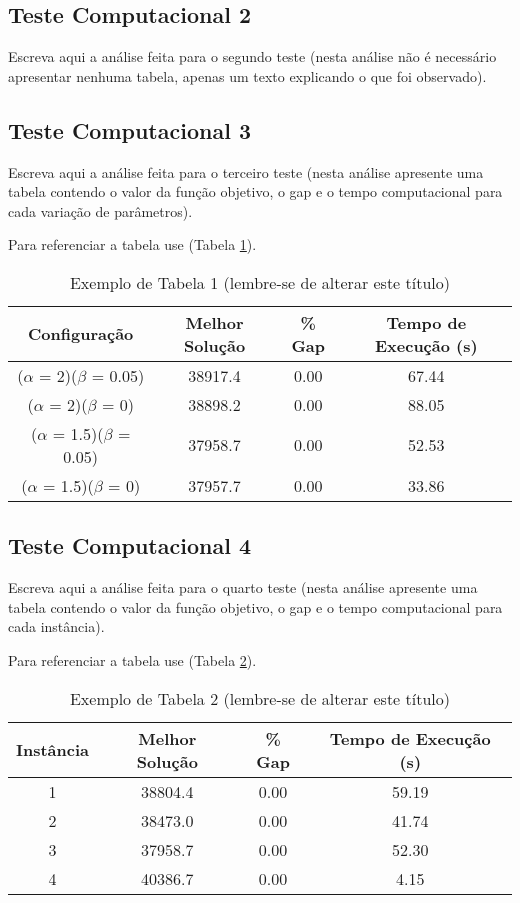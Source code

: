 \documentclass{article}
\begin{document}
\subsection{Teste Computacional 2}

Escreva aqui a análise feita para o segundo teste (nesta análise não é necessário apresentar nenhuma tabela, apenas um texto explicando o que foi observado).

\subsection{Teste Computacional 3}

Escreva aqui a análise feita para o terceiro teste (nesta análise apresente uma tabela contendo o valor da função objetivo, o gap e o tempo computacional para cada variação de parâmetros).

Para referenciar a tabela use (Tabela \ref{tab:configuracoes}).

\begin{table}[H]
	\centering
	\caption{Exemplo de Tabela 1 (lembre-se de alterar este título)}
		\begin{tabular}{c c c c} \hline
	 	Configuração & Melhor Solução & \% Gap & Tempo de Execução (s) \\ \hline
		  ($\alpha$ = 2)($\beta$ = 0.05) & 38917.4 & 0.00 & 67.44 \\
		($\alpha$ = 2)($\beta$ = 0) & 38898.2 & 0.00 & 88.05 \\ 
		($\alpha$ = 1.5)($\beta$ = 0.05) & 37958.7 & 0.00 & 52.53 \\
		($\alpha$ = 1.5)($\beta$ = 0) & 37957.7 & 0.00 & 33.86 \\  \hline
		\end{tabular}
  \label{tab:configuracoes}
\end{table}

\subsection{Teste Computacional 4}

Escreva aqui a análise feita para o quarto teste (nesta análise apresente uma tabela contendo o valor da função objetivo, o gap e o tempo computacional para cada instância).

Para referenciar a tabela use (Tabela \ref{tab:teste4}).

\begin{table}[H]
	\centering
	\caption{Exemplo de Tabela 2 (lembre-se de alterar este título)}
		\begin{tabular}{c c c c} \hline
	 	Instância & Melhor Solução & \% Gap & Tempo de Execução (s) \\ \hline
		1  & 38804.4 & 0.00 & 59.19 \\
		2 & 38473.0 & 0.00 & 41.74 \\ 
		3 & 37958.7 & 0.00 & 52.30 \\
		4 & 40386.7 & 0.00 & 4.15 \\  \hline
		\end{tabular}
  \label{tab:teste4}
\end{table}
\end{document}
